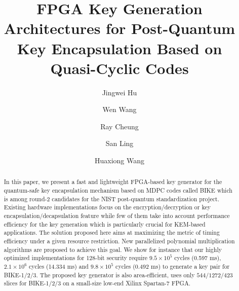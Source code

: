 \documentclass[runningheads]{llncs}
\begin{document}
%
\title{FPGA Key Generation Architectures for Post-Quantum Key Encapsulation Based on Quasi-Cyclic Codes}
%
%
\author{Jingwei Hu \and Wen Wang \and Ray Cheung \and San Ling \and Huaxiong Wang}



%


%
\maketitle              %
%


\begin{abstract}
  In this paper, we present a fast and lightweight FPGA-based key generator for the
quantum-safe key encapsulation mechanism based on MDPC codes called BIKE which is among round-2 candidates for the NIST post-quantum standardization project. Existing hardware implementations
focus on the encryption/decryption or key encapsulation/decapsulation feature while few of them take into account
performance efficiency for the key generation which is particularly crucial for
KEM-based applications. The solution proposed here
aims at maximizing the metric of timing efficiency under a given resource restriction. New
parallelized polynomial multiplication algorithms are proposed to achieve this goal.
We show for instance that our highly optimized implementations for 128-bit security require $9.5\times 10^5$ cycles (0.597 ms), $2.1\times 10^6$ cycles (14.334 ms) and $9.8\times 10^5$ cycles (0.492 ms) to generate a key pair for BIKE-1/2/3. The proposed key generator is also area-efficient, uses only $544/1272/423$ slices for BIKE-1/2/3 on a small-size low-end Xilinx Spartan-7 FPGA.

\end{abstract}
%
%
%
\end{document}
